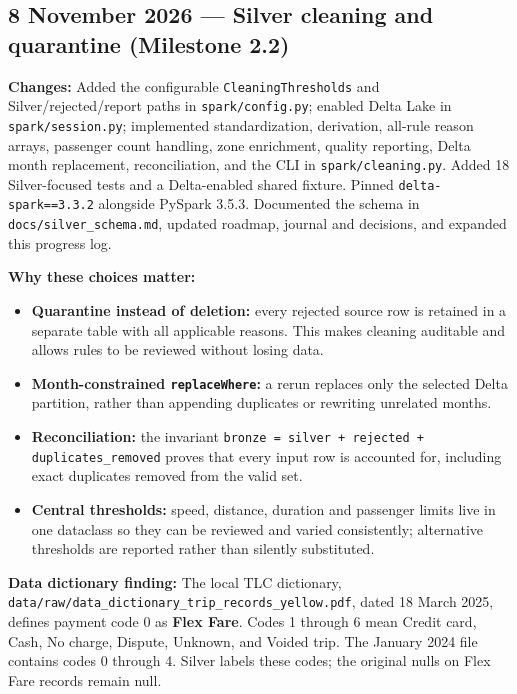 \documentclass[11pt,a4paper]{article}
\begin{document}
\subsection{8 November 2026 --- Silver cleaning and quarantine (Milestone 2.2)}
\textbf{Changes:} Added the configurable \texttt{CleaningThresholds} and
Silver/rejected/report paths in \texttt{spark/config.py}; enabled Delta Lake in
\texttt{spark/session.py}; implemented standardization, derivation, all-rule
reason arrays, passenger count handling, zone enrichment, quality reporting,
Delta month replacement, reconciliation, and the CLI in
\texttt{spark/cleaning.py}. Added 18 Silver-focused tests and a Delta-enabled
shared fixture. Pinned \texttt{delta-spark==3.3.2} alongside PySpark 3.5.3.
Documented the schema in \texttt{docs/silver\_schema.md}, updated roadmap,
journal and decisions, and expanded this progress log.

\textbf{Why these choices matter:}
\begin{itemize}
  \item \textbf{Quarantine instead of deletion:} every rejected source row is
        retained in a separate table with all applicable reasons. This makes
        cleaning auditable and allows rules to be reviewed without losing data.
  \item \textbf{Month-constrained \texttt{replaceWhere}:} a rerun replaces only
        the selected Delta partition, rather than appending duplicates or
        rewriting unrelated months.
  \item \textbf{Reconciliation:} the invariant
        \texttt{bronze = silver + rejected + duplicates\_removed} proves that
        every input row is accounted for, including exact duplicates removed
        from the valid set.
  \item \textbf{Central thresholds:} speed, distance, duration and passenger
        limits live in one dataclass so they can be reviewed and varied
        consistently; alternative thresholds are reported rather than silently
        substituted.
\end{itemize}

\textbf{Data dictionary finding:} The local TLC dictionary,
\texttt{data/raw/data\_dictionary\_trip\_records\_yellow.pdf}, dated
18 March 2025, defines payment code 0 as \textbf{Flex Fare}. Codes 1 through 6
mean Credit card, Cash, No charge, Dispute, Unknown, and Voided trip. The
January 2024 file contains codes 0 through 4. Silver labels these codes;
the original nulls on Flex Fare records remain null.
\end{document}
